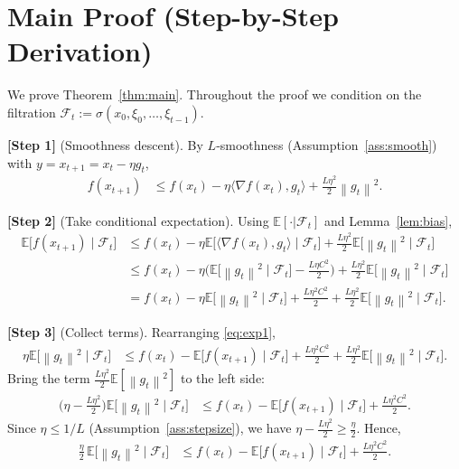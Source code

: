 \documentclass{article}
\newcommand{\EE}{\mathbb{E}}
\newcommand{\norm}[1]{\left\lVert#1\right\rVert}
\begin{document}
\section*{Main Proof (Step-by-Step Derivation)}
We prove Theorem~\ref{thm:main}. Throughout the proof we condition on the filtration $\mathcal{F}_t:=\sigma(x_0,\xi_0,\dots,\xi_{t-1})$.

\noindent\textbf{[Step 1]} (Smoothness descent). By $L$‑smoothness (Assumption~\ref{ass:smooth}) with $y=x_{t+1}=x_t-\eta g_t$,
\begin{align}
f(x_{t+1}) 
&\le f(x_t)-\eta\langle\nabla f(x_t),g_t\rangle
+\frac{L\eta^2}{2}\norm{g_t}^2 . \label{eq:smooth}
\end{align}

\noindent\textbf{[Step 2]} (Take conditional expectation). Using $\EE[\cdot|\mathcal{F}_t]$ and Lemma~\ref{lem:bias},
\begin{align}
\EE\!\big[f(x_{t+1})\mid\mathcal{F}_t\big]
&\le f(x_t)-\eta\EE\!\big[\langle\nabla f(x_t),g_t\rangle\mid\mathcal{F}_t\big]
+\frac{L\eta^2}{2}\EE\!\big[\norm{g_t}^2\mid\mathcal{F}_t\big] \nonumber\\
&\le f(x_t)-\eta\Big(\EE\!\big[\norm{g_t}^2\mid\mathcal{F}_t\big]
-\frac{L\eta C^2}{2}\Big)
+\frac{L\eta^2}{2}\EE\!\big[\norm{g_t}^2\mid\mathcal{F}_t\big] \nonumber\\
&= f(x_t)-\eta\EE\!\big[\norm{g_t}^2\mid\mathcal{F}_t\big]
+\frac{L\eta^2 C^2}{2}
+\frac{L\eta^2}{2}\EE\!\big[\norm{g_t}^2\mid\mathcal{F}_t\big] . \label{eq:exp1}
\end{align}

\noindent\textbf{[Step 3]} (Collect terms). Rearranging \eqref{eq:exp1},
\begin{align}
\eta\EE\!\big[\norm{g_t}^2\mid\mathcal{F}_t\big]
&\le f(x_t)-\EE\!\big[f(x_{t+1})\mid\mathcal{F}_t\big]
+\frac{L\eta^2 C^2}{2}
+\frac{L\eta^2}{2}\EE\!\big[\norm{g_t}^2\mid\mathcal{F}_t\big] .
\end{align}
Bring the term $\frac{L\eta^2}{2}\EE[\norm{g_t}^2]$ to the left side:
\begin{align}
\Big(\eta-\frac{L\eta^2}{2}\Big)\EE\!\big[\norm{g_t}^2\mid\mathcal{F}_t\big]
&\le f(x_t)-\EE\!\big[f(x_{t+1})\mid\mathcal{F}_t\big]
+\frac{L\eta^2 C^2}{2}. \label{eq:collect}
\end{align}
Since $\eta\le 1/L$ (Assumption~\ref{ass:stepsize}), we have $\eta-\frac{L\eta^2}{2}\ge \frac{\eta}{2}$. Hence,
\begin{align}
\frac{\eta}{2}\,\EE\!\big[\norm{g_t}^2\mid\mathcal{F}_t\big]
&\le f(x_t)-\EE\!\big[f(x_{t+1})\mid\mathcal{F}_t\big]
+\frac{L\eta^2 C^2}{2}. \label{eq:half}
\end{align}
\end{document}
